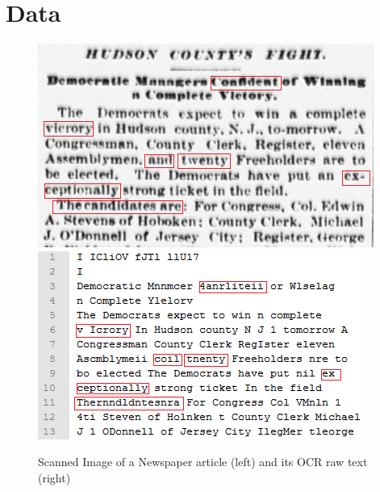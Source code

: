 \documentclass[preprint,11pt]{elsarticle}
\begin{document}
\section{Data}
\label{spell:errors}
\begin{figure}[hbt]
\includegraphics[scale=0.75]{originalimage}
\includegraphics[scale=0.80]{ocr}
\caption{Scanned Image of a Newspaper article (left) and its OCR raw text (right)}
\label{figure:1}
\end{figure}
\end{document}
